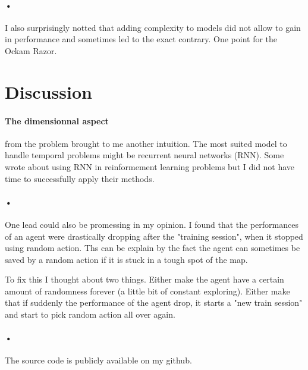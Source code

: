 \documentclass{article}
\begin{document}
\paragraph{•}
I also surprisingly notted that adding complexity to models did not allow to gain in performance and sometimes led to the exact contrary. One point for the Ockam Razor.

\section{Discussion}

\paragraph{The dimensionnal aspect}
from the problem brought to me another intuition. The most suited model to handle temporal problems might be recurrent neural networks (RNN). Some wrote about using RNN in reinformement learning problems\cite{bakker2002reinforcement} but I did not have time to successfully apply their methods.

\paragraph{•}
One lead could also be promessing in my opinion. I found that the performances of an agent were drastically dropping after the "training session", when it stopped using random action. Ths can be explain by the fact the agent can sometimes be saved by a random action if it is stuck in a tough spot of the map.\par
To fix this I thought about two things. Either make the agent have a certain amount of randomness forever (a little bit of constant exploring). Either make that if suddenly the performance of the agent drop, it starts a "new train session" and start to pick random action all over again.

\paragraph{•}
The source code is publicly available on my github\cite{github:bear_grylls_project}.




\end{document}
